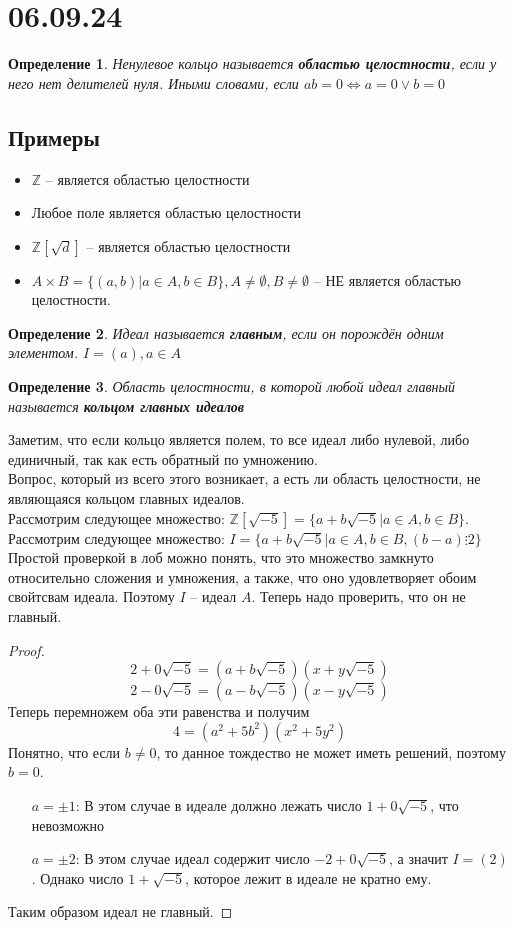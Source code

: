 \documentclass[12pt, a4paper]{article}
\newcommand{\lra}{\Leftrightarrow}
\newcommand{\Z}{\mathds{Z}}
\theoremstyle{plain}
\newtheorem{Def}{Определение}
\theoremstyle{definition}
\begin{document}
\section*{06.09.24}
\begin{Def}
Ненулевое кольцо называется \textbf{областью целостности}, если у него нет делителей нуля. Иными словами, если $ab = 0 \lra a=0 \vee b = 0$
\end{Def}
\subsection*{Примеры}
\begin{itemize}
    \item $\Z$ -- является областью целостности
    \item Любое поле является областью целостности
    \item $\Z[\sqrt{d}]$ -- является областью целостности
    \item $A\times B = \{(a,b)|a\in A, b\in B\}, A\neq \emptyset, B\neq \emptyset$ -- НЕ является областью целостности.
\end{itemize}
\begin{Def}
    Идеал называется \textbf{главным}, если он порождён одним элементом. $I = (a), a \in A$
\end{Def}
\begin{Def}
    Область целостности, в которой любой идеал главный называется \textbf{кольцом главных идеалов}
\end{Def}
Заметим, что если кольцо является полем, то все идеал либо нулевой, либо единичный, так как есть обратный по умножению.
\\
Вопрос, который из всего этого возникает, а есть ли область целостности, не являющаяся кольцом главных идеалов.
\\
Рассмотрим следующее множество: $\Z[\sqrt{-5}] = \{a+b\sqrt{-5}| a \in A, b\in B\}$. \\
Рассмотрим следующее множество: $I = \{a+b\sqrt{-5}| a\in A, b\in B, (b-a)\vdots 2\}$ 
\\
Простой проверкой в лоб можно понять, что это множество замкнуто относительно сложения и умножения, а также, что оно удовлетворяет обоим свойтсвам идеала. Поэтому $I$ -- идеал $A$.
Теперь надо проверить, что он не главный. 
\\
\begin{proof}

    \[2+0\sqrt{-5} = (a+b\sqrt{-5})(x+y\sqrt{-5}) \]
    \[2-0\sqrt{-5} = (a-b\sqrt{-5})(x-y\sqrt{-5}) \]
Теперь перемножем оба эти равенства и получим
\[4 = (a^2+5b^2)(x^2+5y^2)\]
Понятно, что если $b\neq 0$, то данное тождество не может иметь решений, поэтому $b=0$.
\begin{enumerate}
    \item[$a = \pm 1$: ] В этом случае в идеале должно лежать число $1+0\sqrt{-5}$, что невозможно
    \item[$a = \pm 2$: ] В этом случае идеал содержит число $-2+0\sqrt{-5}$, а значит $I=(2)$. Однако число $1+\sqrt{-5}$, которое лежит в идеале не кратно ему.
\end{enumerate}
Таким образом идеал не главный.
\end{proof}
\end{document}

